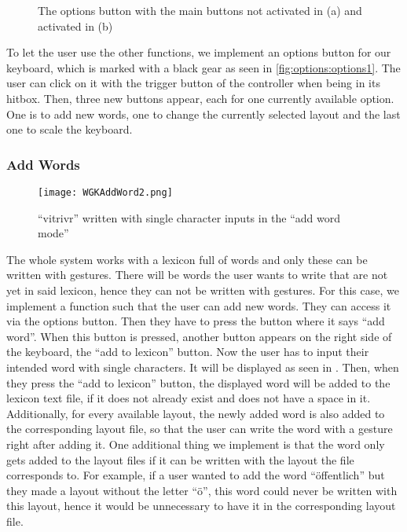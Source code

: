 \begin{figure}[H]
    \caption{The options button with the main buttons not activated in (a) and activated in (b)}
    \label{fig:options}
\end{figure}

To let the user use the other functions, we implement an options button for our keyboard, which is marked with a black gear as seen in \cref{fig:options:options1}. The user can click on it with the trigger button of the controller when being in its hitbox. Then, three new buttons appear, each for one currently available option. One is to add new words, one to change the currently selected layout and the last one to scale the keyboard.

\subsubsection{Add Words}
\begin{figure}[H]
    \centering
    \texttt{[image: WGKAddWord2.png]}
    \caption{``vitrivr'' written with single character inputs in the ``add word mode''}
    \label{fig:addword}
\end{figure}
The whole system works with a lexicon full of words and only these can be written with gestures. There will be words the user wants to write that are not yet in said lexicon, hence they can not be written with gestures. For this case, we implement a function such that the user can add new words. They can access it via the options button. Then they have to press the button where it says ``add word''. When this button is pressed, another button appears on the right side of the keyboard, the ``add to lexicon'' button. Now the user has to input their intended word with single characters. It will be displayed as seen in . Then, when they press the ``add to lexicon'' button, the displayed word will be added to the lexicon text file, if it does not already exist and does not have a space in it. Additionally, for every available layout, the newly added word is also added to the corresponding layout file, so that the user can write the word with a gesture right after adding it. One additional thing we implement is that the word only gets added to the layout files if it can be written with the layout the file corresponds to. For example, if a user wanted to add the word ``öffentlich'' but they made a layout without the letter ``ö'', this word could never be written with this layout, hence it would be unnecessary to have it in the corresponding layout file.

